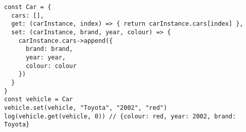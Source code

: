 \vspace{-2.5em}
\begin{center}
\begin{minipage}[t]{1\textwidth}
\begin{listing}[H]
\begin{spacing}{0.6}
\begin{verbatim}
const Car = {
  cars: [],
  get: (carInstance, index) => { return carInstance.cars[index] },
  set: (carInstance, brand, year, colour) => {
    carInstance.cars->append({
      brand: brand,
      year: year,
      colour: colour
    })
  }
}
const vehicle = Car
vehicle.set(vehicle, "Toyota", "2002", "red")
log(vehicle.get(vehicle, 0)) // {colour: red, year: 2002, brand: Toyota}
\end{verbatim}
\end{spacing}
\end{listing}
\end{minipage}
\end{center}
